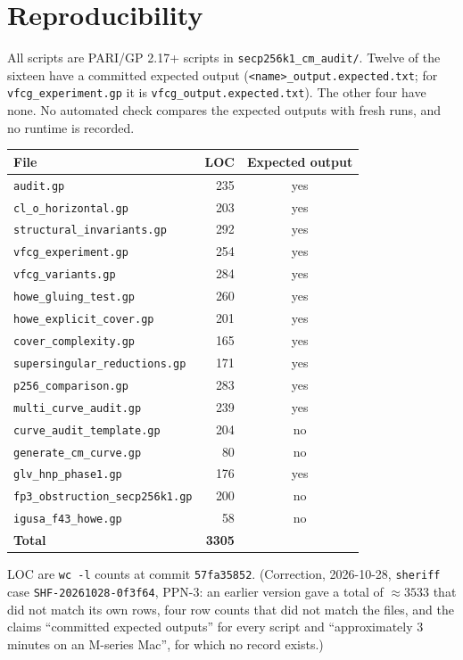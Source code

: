 \documentclass[11pt,a4paper]{article}
\theoremstyle{definition}
\begin{document}
\section{Reproducibility}

All scripts are PARI/GP 2.17+ scripts in
\nolinkurl{secp256k1_cm_audit/}. Twelve of the sixteen have a committed
expected output (\texttt{<name>\_output.expected.txt}; for
\texttt{vfcg\_experiment.gp} it is \texttt{vfcg\_output.expected.txt}).
The other four have none. No automated check compares the expected
outputs with fresh runs, and no runtime is recorded.

\begin{center}
\small
\begin{tabular}{lrc}
\toprule
File & LOC & Expected output \\
\midrule
\texttt{audit.gp} & 235 & yes \\
\texttt{cl\_o\_horizontal.gp} & 203 & yes \\
\texttt{structural\_invariants.gp} & 292 & yes \\
\texttt{vfcg\_experiment.gp} & 254 & yes \\
\texttt{vfcg\_variants.gp} & 284 & yes \\
\texttt{howe\_gluing\_test.gp} & 260 & yes \\
\texttt{howe\_explicit\_cover.gp} & 201 & yes \\
\texttt{cover\_complexity.gp} & 165 & yes \\
\texttt{supersingular\_reductions.gp} & 171 & yes \\
\texttt{p256\_comparison.gp} & 283 & yes \\
\texttt{multi\_curve\_audit.gp} & 239 & yes \\
\texttt{curve\_audit\_template.gp} & 204 & no \\
\texttt{generate\_cm\_curve.gp} & 80 & no \\
\texttt{glv\_hnp\_phase1.gp} & 176 & yes \\
\texttt{fp3\_obstruction\_secp256k1.gp} & 200 & no \\
\texttt{igusa\_f43\_howe.gp} & 58 & no \\
\midrule
\textbf{Total} & \textbf{3305} & \\
\bottomrule
\end{tabular}
\end{center}

\noindent LOC are \texttt{wc -l} counts at commit \texttt{57fa35852}.
(Correction, 2026-10-28, \texttt{sheriff} case
\texttt{SHF-20261028-0f3f64}, PPN-3: an earlier version gave a total of
$\approx 3533$ that did not match its own rows, four row counts that did
not match the files, and the claims ``committed expected outputs'' for
every script and ``approximately 3 minutes on an M-series Mac'', for
which no record exists.)
\end{document}
